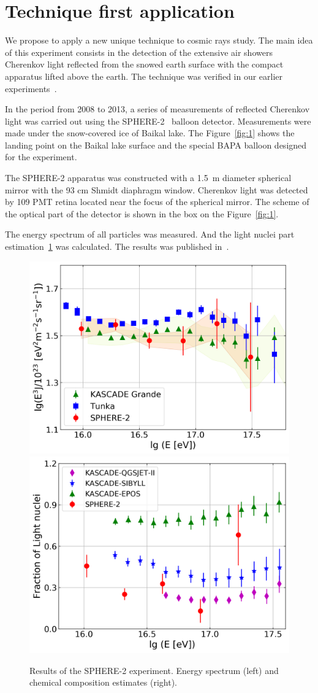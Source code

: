 \documentclass[a4paper,11pt]{article}
\begin{document}
\section{Technique first application}

We propose to apply a new unique technique to cosmic rays study. The main idea of this experiment consists in the detection of the extensive air showers Cherenkov light reflected from the snowed earth surface with the compact apparatus lifted above the earth. The technique was verified in our earlier experiments~\cite{1,2}.

In the period from 2008 to 2013, a series of measurements of reflected Cherenkov light was carried out using the SPHERE-2~\cite{1,2,3} balloon detector. Measurements were made under the snow-covered ice of Baikal lake. The Figure~\ref{fig:1} shows the landing point on the Baikal lake surface and the special BAPA balloon designed for the experiment. 

The SPHERE-2 apparatus was constructed with a 1.5~m diameter spherical mirror with the 93 cm Shmidt diaphragm window. Cherenkov light was detected by 109 PMT retina located near the focus of the spherical mirror. The scheme of the optical part of the detector is shown in the box on the Figure~\ref{fig:1}.

The energy spectrum of all particles was measured. And the light nuclei part estimation~\ref{fig:2} was calculated. The results was published in~\cite{2}. 

\begin{figure}[htbp]
\centering %
\includegraphics[width=.4\textwidth,trim=0 0 0 0,clip]{sphere2spectrum.png}
\qquad
\includegraphics[width=.4\textwidth,origin=c,angle=0]{sphere2composition.png}
\caption{\label{fig:2} Results of the SPHERE-2 experiment. Energy spectrum (left) and chemical composition estimates (right).}
\end{figure}
\end{document}
